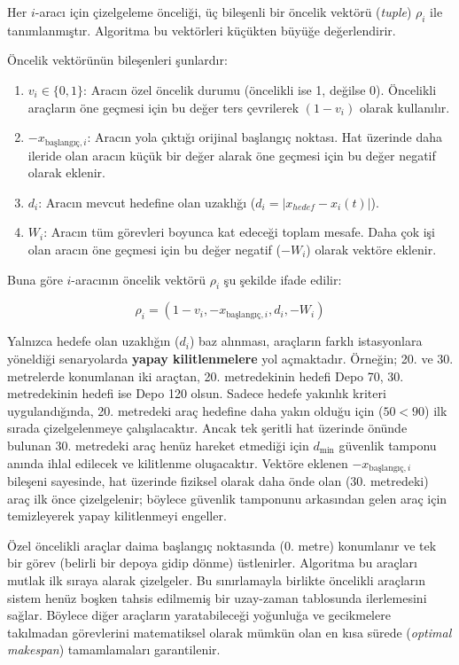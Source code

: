 Her $i$-aracı için çizelgeleme önceliği, üç bileşenli bir öncelik vektörü (\textit{tuple}) $\rho_i$ ile tanımlanmıştır. Algoritma bu vektörleri küçükten büyüğe değerlendirir.

Öncelik vektörünün bileşenleri şunlardır:

\begin{enumerate}
    \item $v_i \in \{0, 1\}$: Aracın özel öncelik durumu (öncelikli ise 1, değilse 0). Öncelikli araçların öne geçmesi için bu değer ters çevrilerek $(1 - v_i)$ olarak kullanılır.
    \item $-x_{\text{başlangıç}, i}$: Aracın yola çıktığı orijinal başlangıç noktası. Hat üzerinde daha ileride olan aracın küçük bir değer alarak öne geçmesi için bu değer negatif olarak eklenir.
    \item $d_i$: Aracın mevcut hedefine olan uzaklığı ($d_i = |x_{hedef} - x_i(t)|$).
    \item $W_i$: Aracın tüm görevleri boyunca kat edeceği toplam mesafe. Daha çok işi olan aracın öne geçmesi için bu değer negatif ($-W_i$) olarak vektöre eklenir.
\end{enumerate}

Buna göre $i$-aracının öncelik vektörü $\rho_i$ şu şekilde ifade edilir:

\begin{equation}
    \rho_i = (1 - v_i, -x_{\text{başlangıç}, i}, d_i, -W_i)
\end{equation}


Yalnızca hedefe olan uzaklığın ($d_i$) baz alınması, araçların farklı istasyonlara yöneldiği senaryolarda \textbf{yapay kilitlenmelere} yol açmaktadır. Örneğin; 20. ve 30. metrelerde konumlanan iki araçtan, 20. metredekinin hedefi Depo 70, 30. metredekinin hedefi ise Depo 120 olsun. Sadece hedefe yakınlık kriteri uygulandığında, 20. metredeki araç hedefine daha yakın olduğu için ($50 < 90$) ilk sırada çizelgelenmeye çalışılacaktır. Ancak tek şeritli hat üzerinde önünde bulunan 30. metredeki araç henüz hareket etmediği için $d_{\min}$ güvenlik tamponu anında ihlal edilecek ve kilitlenme oluşacaktır. Vektöre eklenen $-x_{\text{başlangıç}, i}$ bileşeni sayesinde, hat üzerinde fiziksel olarak daha önde olan (30. metredeki) araç ilk önce çizelgelenir; böylece güvenlik tamponunu arkasından gelen araç için temizleyerek yapay kilitlenmeyi engeller.

Özel öncelikli araçlar daima başlangıç noktasında (0. metre) konumlanır ve tek bir görev (belirli bir depoya gidip dönme) üstlenirler. Algoritma bu araçları mutlak ilk sıraya alarak çizelgeler. Bu sınırlamayla birlikte öncelikli araçların sistem henüz boşken tahsis edilmemiş bir uzay-zaman tablosunda ilerlemesini sağlar. Böylece diğer araçların yaratabileceği yoğunluğa ve gecikmelere takılmadan görevlerini matematiksel olarak mümkün olan en kısa sürede (\textit{optimal makespan}) tamamlamaları garantilenir.

